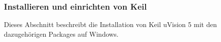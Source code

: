 \subsubsection{Installieren und einrichten von Keil}
\label{sec:KeilInstall}

Dieses Abschnitt beschreibt die Installation von Keil uVision 5 mit den dazugehörigen Packages auf Windows.
